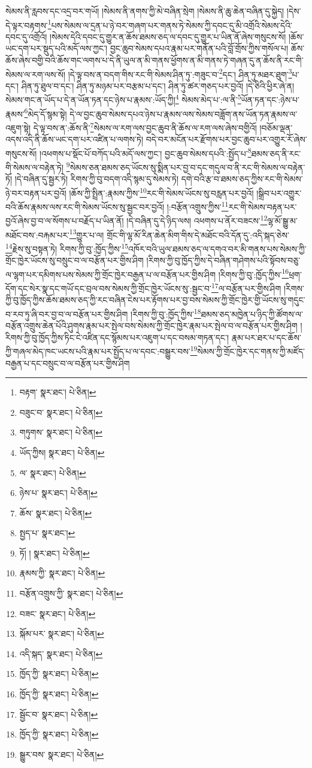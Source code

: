 སེམས་ནི་རླབས་དང་འདྲ་བར་གཡོ། །སེམས་ནི་ནགས་ཀྱི་མེ་བཞིན་སྲེག །སེམས་ནི་ཆུ་ཆེན་བཞིན་དུ་སྐྱེད། །དེས་དེ་ལྟར་བརྟགས་\footnote{བརྟག་  སྣར་ཐང་།  པེ་ཅིན། }པས་སེམས་ལ་དྲན་པ་ཉེ་བར་གཞག་པར་གནས་ཏེ་སེམས་ཀྱི་དབང་དུ་མི་འགྲོའི་སེམས་དེའི་དབང་དུ་འགྲོའོ། །སེམས་དེའི་དབང་དུ་གྱུར་ན་ཆོས་ཐམས་ཅད་ལ་དབང་དུ་གྱུར་པ་ཡིན་ནོ་ཞེས་གསུངས་སོ། །ཆོས་ཡང་དག་པར་སྡུད་པའི་མདོ་ལས་ཀྱང་། བྱང་ཆུབ་སེམས་དཔའ་རྣམ་པར་གནོན་པའི་བློ་གྲོས་ཀྱིས་གསོལ་པ། ཆོས་ཆོས་ཞེས་བགྱི་བའི་ཆོས་གང་ལགས་པ་དེ་ནི་ཡུལ་ན་མི་གནས་ཕྱོགས་ན་མི་གནས་ཏེ་གཞན་དུ་ན་ཆོས་ནི་རང་གི་སེམས་ལ་རག་ལས་སོ། །དེ་ལྟ་བས་ན་བདག་གིས་རང་གི་སེམས་ཤིན་ཏུ་:གཟུང་བ་\footnote{བཟུང་བ་  སྣར་ཐང་།  པེ་ཅིན། }དང་། ཤིན་ཏུ་མཐར་ཐུག་\footnote{གཏུགས་  སྣར་ཐང་།  པེ་ཅིན། }པ་དང་། ཤིན་ཏུ་ཐུལ་བ་དང་། ཤིན་ཏུ་མཉམ་པར་བརྩམ་པ་དང་། ཤིན་ཏུ་ཚར་གཅད་པར་བྱའོ། །དེ་ཅིའི་ཕྱིར་ཞེ་ན། སེམས་གང་ན་ཡོད་པ་དེ་ན་ཡོན་ཏན་དང་ཉེས་པ་རྣམས་:ཡོད་ཀྱི།\footnote{ཡོད་ཀྱིས།  སྣར་ཐང་།  པེ་ཅིན། } སེམས་མེད་པ་:ལ་ནི་\footnote{ལ་  སྣར་ཐང་།  པེ་ཅིན། }ཡོན་ཏན་དང་:ཉེས་པ་རྣམས་\footnote{ཉེས་པ་  སྣར་ཐང་།  པེ་ཅིན། }མེད་དོ་སྙམ་སྟེ། དེ་ལ་བྱང་ཆུབ་སེམས་དཔའ་ཉེས་པ་རྣམས་ལས་སེམས་བཟློག་ནས་ཡོན་ཏན་རྣམས་ལ་འཇུག་སྟེ། དེ་ལྟ་བས་ན་:ཆོས་ནི་\footnote{ཆོས་  སྣར་ཐང་།  པེ་ཅིན། }སེམས་ལ་རག་ལས་བྱང་ཆུབ་ནི་ཆོས་ལ་རག་ལས་ཞེས་བགྱིའོ། །བཅོམ་ལྡན་འདས་འདི་ནི་ཆོས་ཡང་དག་པར་འཛིན་པ་ལགས་ཏེ། བདེ་བར་མངོན་པར་རྫོགས་པར་བྱང་ཆུབ་པར་འགྱུར་རོ་ཞེས་གསུངས་སོ། །འཕགས་པ་སྡོང་པོ་བཀོད་པའི་མདོ་ལས་ཀྱང་། བྱང་ཆུབ་སེམས་དཔའི་:སྤྱོད་པ་\footnote{སྤྱད་པ་  སྣར་ཐང་། }ཐམས་ཅད་ནི་རང་གི་སེམས་ལ་བརྟེན་ཏེ། \footnote{ཏོ། །   སྣར་ཐང་།  པེ་ཅིན། }སེམས་ཅན་ཐམས་ཅད་ཡོངས་སུ་སྨིན་པར་བྱ་བ་དང་གདུལ་བ་ནི་རང་གི་སེམས་ལ་བརྟེན་ཏོ། །དེ་བཞིན་དུ་སྦྱར་ཏེ། རིགས་ཀྱི་བུ་བདག་འདི་སྙམ་དུ་སེམས་ཏེ། དགེ་བའི་རྩ་བ་ཐམས་ཅད་ཀྱིས་རང་གི་སེམས་ཉེ་བར་བརྟན་པར་བྱའོ། །ཆོས་ཀྱི་སྤྲིན་:རྣམས་ཀྱིས་\footnote{རྣམས་ཀྱི་  སྣར་ཐང་།  པེ་ཅིན། }རང་གི་སེམས་ཡོངས་སུ་བརླན་པར་བྱའོ། །སྒྲིབ་པར་འགྱུར་བའི་ཆོས་རྣམས་ལས་རང་གི་སེམས་ཡོངས་སུ་སྦྱང་བར་བྱའོ། །:བརྩོན་འགྲུས་ཀྱིས་\footnote{བརྩོན་འགྲུས་ཀྱི་  སྣར་ཐང་།  པེ་ཅིན། }རང་གི་སེམས་བརྟན་པར་བྱའོ་ཞེས་བྱ་བ་ལ་སོགས་པ་བརྗོད་པ་ཡིན་ནོ། །དེ་བཞིན་དུ་དེ་ཉིད་ལས། འཕགས་པ་ནོར་བཟངས་\footnote{བཟང་  སྣར་ཐང་།  པེ་ཅིན། }ལྷ་མོ་སྒྱུ་མ་མཐོང་བས་:བརྐམ་པར་\footnote{སྐོམ་པར་  སྣར་ཐང་།  པེ་ཅིན། }གྱུར་པ་ལ། གྲོང་གི་ལྷ་མོ་རིན་ཆེན་མིག་གིས་དེ་མཐོང་བའི་དོན་དུ་:འདི་སྐད་ཅེས་\footnote{འདི་སྐད་  སྣར་ཐང་།  པེ་ཅིན། }རྗེས་སུ་བསྟན་ཏེ། རིགས་ཀྱི་བུ་:ཁྱོད་ཀྱིས་\footnote{ཁྱོད་ཀྱི་  སྣར་ཐང་།  པེ་ཅིན། }འཁོར་བའི་ཡུལ་ཐམས་ཅད་ལ་དགའ་བར་མི་གནས་པས་སེམས་ཀྱི་གྲོང་ཁྱེར་ཡོངས་སུ་བསྲུང་བ་ལ་བརྩོན་པར་གྱིས་ཤིག །རིགས་ཀྱི་བུ་ཁྱོད་ཀྱིས་དེ་བཞིན་གཤེགས་པའི་སྟོབས་བཅུ་ལ་ལྷག་པར་དམིགས་པས་སེམས་ཀྱི་གྲོང་ཁྱེར་བརྒྱན་པ་ལ་བརྩོན་པར་གྱིས་ཤིག །རིགས་ཀྱི་བུ་:ཁྱོད་ཀྱིས་\footnote{ཁྱོད་ཀྱི་  སྣར་ཐང་།  པེ་ཅིན། }ཕྲག་དོག་དང་སེར་སྣ་དང་གཡོ་དང་བྲལ་བས་སེམས་ཀྱི་གྲོང་ཁྱེར་ཡོངས་སུ་:སྦྱང་བ་\footnote{སྦྱོང་བ་  སྣར་ཐང་།  པེ་ཅིན། }ལ་བརྩོན་པར་གྱིས་ཤིག །རིགས་ཀྱི་བུ་ཁྱོད་ཀྱིས་ཆོས་ཐམས་ཅད་ཀྱི་རང་བཞིན་ངེས་པར་རྟོགས་པར་བྱ་བས་སེམས་ཀྱི་གྲོང་ཁྱེར་གྱི་ཡོངས་སུ་གདུང་བ་རབ་ཏུ་ཞི་བར་བྱ་བ་ལ་བརྩོན་པར་གྱིས་ཤིག །རིགས་ཀྱི་བུ་:ཁྱོད་ཀྱིས་\footnote{ཁྱོད་ཀྱི་  སྣར་ཐང་།  པེ་ཅིན། }ཐམས་ཅད་མཁྱེན་པ་ཉིད་ཀྱི་ཚོགས་ལ་བརྩོན་འགྲུས་ཆེན་པོའི་ཤུགས་རྣམ་པར་སྤེལ་བས་སེམས་ཀྱི་གྲོང་ཁྱེར་རྣམ་པར་སྤེལ་བ་ལ་བརྩོན་པར་གྱིས་ཤིག །རིགས་ཀྱི་བུ་ཁྱོད་ཀྱིས་ཏིང་ངེ་འཛིན་དང་སྙོམས་པར་འཇུག་པ་དང་བསམ་གཏན་དང་། རྣམ་པར་ཐར་པ་དང་ཆོས་ཀྱི་གཞལ་མེད་ཁང་ཡངས་པའི་རྣམ་པར་སྤྱོད་པ་ལ་དབང་:བསྒྱུར་བས་\footnote{སྒྱུར་བས་  སྣར་ཐང་།  པེ་ཅིན། }སེམས་ཀྱི་གྲོང་ཁྱེར་དང་གནས་ཀྱི་མཛོད་བརྒྱན་པ་དང་བསྲུང་བ་ལ་བརྩོན་པར་གྱིས་ཤིག 